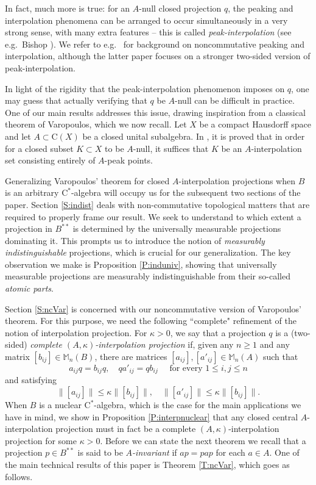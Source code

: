 \documentclass[10pt]{amsart}
\newcommand{\bM}{{\mathbb{M}}}
\newcommand{\rC}{\mathrm{C}}
\theoremstyle{definition}
\begin{document}
In fact, much more is true:  for an $A$-null closed projection $q$,  the peaking and interpolation phenomena can be arranged to occur simultaneously in a very strong sense, with 
many extra features -- this is called \emph{peak-interpolation}
(see e.g.\ Bishop \cite{bishop1962}).   We refer to 
e.g.\ \cite{blecher2013, blecher2022} for background on noncommutative peaking and interpolation, although the latter paper focuses on a stronger two-sided version of
 peak-interpolation.

In light of the rigidity that the peak-interpolation phenomenon imposes on $q$, one may guess that actually verifying that $q$ be $A$-null can be difficult in practice. One of our main results addresses this issue, drawing inspiration 
from  a classical theorem of Varopoulos, which we now recall. Let $X$ be a compact Hausdorff space and let $A\subset \rC(X)$ be a closed unital subalgebra. In \cite{varopoulos1971}, it is proved that in order for a closed subset $K\subset X$ to be $A$-null, it suffices that $K$ be an $A$-interpolation set consisting entirely of $A$-peak points. 

Generalizing Varopoulos' theorem for closed $A$-interpolation projections when $B$ is an arbitrary $\rC^*$-algebra will occupy us for the subsequent two sections of the paper. Section \ref{S:indist} deals with non-commutative topological matters that are required to properly frame our result. We seek to understand to which extent a projection in $B^{**}$ is determined by the universally measurable projections dominating it. This prompts us to introduce the notion of \emph{measurably indistinguishable} projections, which is crucial for our generalization. The key observation we make is Proposition \ref{P:induniv}, showing that universally measurable projections are measurably indistinguishable from their so-called \emph{atomic parts}.

Section \ref{S:ncVar} is concerned with our noncommutative version of Varopoulos' theorem. For this purpose, we need the following ``complete" refinement of the notion of interpolation projection.  
For $\kappa>0$, we say that a projection $q$ is a (two-sided) \emph{complete $(A,\kappa)$-interpolation projection} if, given any $n\geq 1$ and any matrix $[b_{ij}]\in \bM_n(B)$, there are matrices $[a_{ij}],[a'_{ij}]\in \bM_n(A)$ such that 
\[
 a_{ij}q=b_{ij}q ,\quad  q a'_{ij}=qb_{ij} \quad \text{ for every } 1\leq i,j\leq n
\]
and satisfying
\[
 \|[a_{ij}]\|\leq \kappa \|[b_{ij}]\|,\quad \|[a'_{ij}]\|\leq \kappa \|[b_{ij}]\|.
\]
When $B$ is a nuclear $\rC^*$-algebra, which is the case for the main applications we have in mind, we show in Proposition \ref{P:interpnuclear} that any closed central $A$-interpolation projection must in fact be a complete $(A,\kappa)$-interpolation projection for some $\kappa>0$.
Before we can state 
the next theorem we recall that a projection $p\in B^{**}$ is said to be \emph{$A$-invariant} if $ap=pap$ for each $a\in A$. 
One of the main 
technical results of this paper is Theorem \ref{T:ncVar}, which goes as follows.
\end{document}
